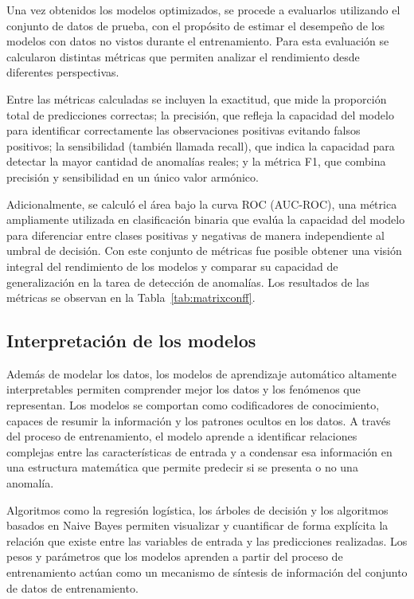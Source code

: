 \documentclass[11pt,a4paper,spanish]{book}
\numberwithin{equation}{chapter}
\numberwithin{figure}{chapter}
\begin{document}
Una vez obtenidos los modelos optimizados, se procede a evaluarlos utilizando el conjunto de datos de prueba, con el propósito de estimar el desempeño de los modelos con datos no vistos durante el entrenamiento. Para esta evaluación se calcularon distintas métricas que permiten analizar el rendimiento desde diferentes perspectivas. 

Entre las métricas calculadas se incluyen la exactitud, que mide la proporción total de predicciones correctas; la precisión, que refleja la capacidad del modelo para identificar correctamente las observaciones positivas evitando falsos positivos; la sensibilidad (también llamada recall), que indica la capacidad para detectar la mayor cantidad de anomalías reales; y la métrica F1, que combina precisión y sensibilidad en un único valor armónico.

Adicionalmente, se calculó el área bajo la curva ROC (AUC-ROC), una métrica ampliamente utilizada en clasificación binaria que evalúa la capacidad del modelo para diferenciar entre clases positivas y negativas de manera independiente al umbral de decisión. Con este conjunto de métricas fue posible obtener una visión integral del rendimiento de los modelos y comparar su capacidad de generalización en la tarea de detección de anomalías. Los resultados de las métricas se observan en  la Tabla~\ref{tab:matrixconff}. 




\subsection{Interpretación de los modelos}


Además de modelar los datos, los modelos de aprendizaje automático altamente interpretables permiten comprender mejor los datos y los fenómenos que representan. Los modelos se comportan como codificadores de conocimiento, capaces de resumir la información y los patrones ocultos en los datos. A través del proceso de entrenamiento, el modelo aprende a identificar relaciones complejas entre las características de entrada y a condensar esa información en una estructura matemática que permite predecir si se presenta o no una anomalía. 


Algoritmos como la regresión logística, los árboles de decisión y los algoritmos basados en Naive Bayes permiten visualizar y cuantificar de forma explícita la relación que existe entre las variables de entrada y las predicciones realizadas. Los pesos y parámetros que los modelos aprenden a partir del proceso de entrenamiento actúan como un mecanismo de síntesis de información del conjunto de datos de entrenamiento. 
\end{document}
